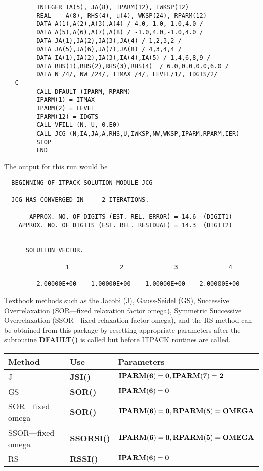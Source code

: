 \begin{verbatim} 
         INTEGER IA(5), JA(8), IPARM(12), IWKSP(12)
         REAL    A(8), RHS(4), u(4), WKSP(24), RPARM(12)
         DATA A(1),A(2),A(3),A(4) / 4.0,-1.0,-1.0,4.0 /
         DATA A(5),A(6),A(7),A(8) / -1.0,4.0,-1.0,4.0 /
         DATA JA(1),JA(2),JA(3),JA(4) / 1,2,3,2 /
         DATA JA(5),JA(6),JA(7),JA(8) / 4,3,4,4 / 
         DATA IA(1),IA(2),IA(3),IA(4),IA(5) / 1,4,6,8,9 /
         DATA RHS(1),RHS(2),RHS(3),RHS(4)  / 6.0,0.0,0.0,6.0 /
         DATA N /4/, NW /24/, ITMAX /4/, LEVEL/1/, IDGTS/2/ 
   C
         CALL DFAULT (IPARM, RPARM)
         IPARM(1) = ITMAX
         IPARM(2) = LEVEL
         IPARM(12) = IDGTS
         CALL VFILL (N, U, 0.E0)
         CALL JCG (N,IA,JA,A,RHS,U,IWKSP,NW,WKSP,IPARM,RPARM,IER)
         STOP
         END
\end{verbatim} 
 
\noindent
The output for this run would be
 
\begin{verbatim} 
  BEGINNING OF ITPACK SOLUTION MODULE JCG
 
  JCG HAS CONVERGED IN     2 ITERATIONS.
 
       APPROX. NO. OF DIGITS (EST. REL. ERROR) = 14.6  (DIGIT1)
    APPROX. NO. OF DIGITS (EST. REL. RESIDUAL) = 14.3  (DIGIT2)
 
 
      SOLUTION VECTOR.
 
                 1              2              3              4
       -------------------------------------------------------------
         2.00000E+00    1.00000E+00    1.00000E+00    2.00000E+00
\end{verbatim} 
 
Textbook methods such as the Jacobi (J), Gauss-Seidel (GS), Successive
Overrelaxation (SOR---fixed relaxation factor omega), Symmetric
Successive Overrelaxation (SSOR---fixed relaxation factor omega), and
the RS method can be obtained from this package by resetting appropriate
parameters after the subroutine {\bf DFAULT()} is called but before 
ITPACK routines are called.

\bigskip
\begin{tabular}{lll} \hline
   Method             & Use            & Parameters \\ \hline
   J                  & {\bf JSI()}    & ${\bf IPARM(6)=0, IPARM(7)=2}$ \\
   GS                 & {\bf SOR()}    & ${\bf IPARM(6)=0}$ \\
   SOR---fixed omega  & {\bf SOR()}    & ${\bf IPARM(6)=0, RPARM(5)=OMEGA}$ \\
   SSOR---fixed omega & {\bf SSORSI()} & ${\bf IPARM(6)=0, RPARM(5)=OMEGA}$ \\
   RS                 & {\bf RSSI()}   & ${\bf IPARM(6)=0}$ \\ \hline
\end{tabular}
\bigskip
 
